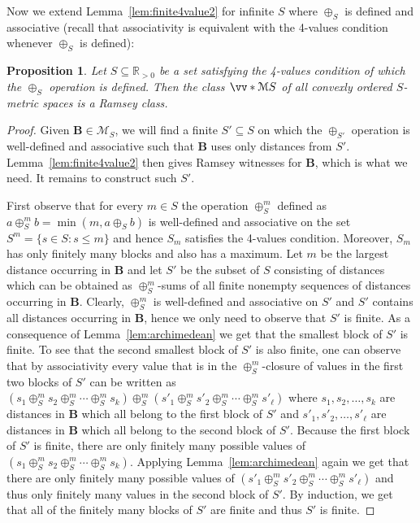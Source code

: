 \documentclass{elsarticle}
\def\ordclasssup#1#2{\vv*{#1}{#2}}
\def\str#1{\mathbf {#1}}
\theoremstyle{plain}
\newtheorem{prop}[theorem]{Proposition}
\theoremstyle{definition}
\theoremstyle{remark}
\begin{document}
Now we extend Lemma~\ref{lem:finite4value2} for infinite $S$ where $\oplus_S$ is defined and associative (recall that associativity is equivalent with the 4-values condition whenever $\oplus_S$ is defined):
\begin{prop}
\label{prop:Smetric}
Let $S\subseteq \mathbb R_{>0}$ be a set satisfying the 4-values
condition of which the $\oplus_S$ operation is defined.  Then the class
$\ordclasssup{\mathcal M}{S}$ of all convexly ordered $S$-metric spaces  is a Ramsey class.
\end{prop} 
\begin{proof}
Given $\str B\in \mathcal M_S$, we will find a finite $S'\subseteq S$ on which the $\oplus_{S'}$ operation is well-defined and associative such that $\str B$ uses only distances from $S'$. Lemma~\ref{lem:finite4value2} then gives Ramsey witnesses for $\str B$, which is what we need. It remains to construct such $S'$.

First observe that for every $m\in S$ the operation $\oplus_S^m$ defined as $a\oplus_S^m b = \min(m, a\oplus_S b)$ is well-defined and associative on the set $S^m=\{s\in S : s\leq m\}$ and hence $S_m$ satisfies the 4-values condition. Moreover, $S_m$ has only finitely many blocks and also has a maximum. Let $m$ be the largest distance occurring in $\str B$ and let $S'$ be the subset of $S$ consisting of distances which can be obtained as $\oplus_S^m$-sums of all finite nonempty sequences of distances occurring in $\str B$. Clearly, $\oplus_S^m$ is well-defined and associative on $S'$ and $S'$ contains all distances occurring in $\str B$, hence we only need to observe that $S'$ is finite. As a consequence of Lemma~\ref{lem:archimedean} we get that the smallest block of $S'$ is finite. 
To see that the second smallest block of $S'$ is also finite, one can observe that by associativity every value that is in the $\oplus_S^m$-closure of values in the first two blocks of $S'$ can be written as $(s_1\oplus_S^m s_2\oplus_S^m\cdots\oplus_S^m s_k)\oplus_S^m (s'_1\oplus_S^m s'_2\oplus_S^m\cdots\oplus_S^m s'_\ell)$ where $s_1,s_2,\ldots, s_k$ are distances in $\str B$ which all belong to the first block of $S'$ and $s'_1,s'_2,\ldots, s'_\ell$ are distances in $\str B$ which all belong to the second block of $S'$. Because the first block of $S'$ is finite, there are only finitely many possible values of $(s_1\oplus_S^m s_2\oplus_S^m\cdots\oplus_S^m s_k)$. Applying Lemma~\ref{lem:archimedean} again we get that there are only finitely many possible values of $(s'_1\oplus_S^m s'_2\oplus_S^m\cdots\oplus_S^m s'_\ell)$ and thus only finitely many values in the second block of $S'$. 
By induction, we get that all of the finitely many blocks of $S'$ are finite and thus $S'$ is finite.
\end{proof}
\end{document}
